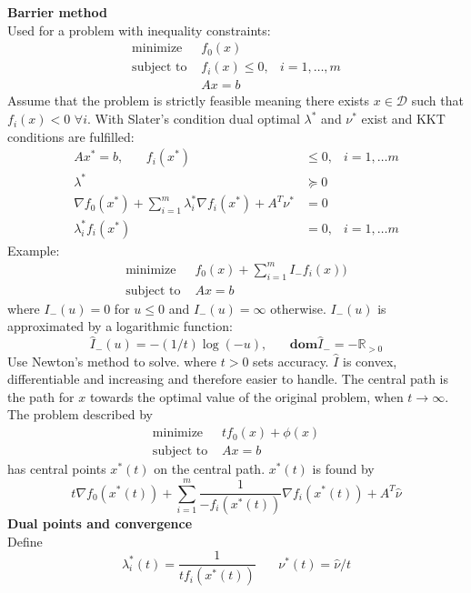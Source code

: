 \documentclass[12pt,a4paper]{report}
\begin{document}
\clearpage
{}\\\\
\textbf{Barrier method}\\
Used for a problem with inequality constraints:
\begin{align*}
\text{minimize }&f_0(x)\\
\text{subject to }&f_i(x)\leq0,&i=1,\ldots,m\\
&Ax=b
\end{align*}
Assume that the problem is strictly feasible meaning there exists $x\in\mathcal{D}$ such that $f_i(x)<0$ $\forall i$. With Slater's condition dual optimal $\lambda^*$ and $\nu^*$ exist and KKT conditions are fulfilled:
\begin{align*}
Ax^*=b,\phantom{mm}f_i(x^*)&\leq0,&i=1,\ldots m\\
\lambda^*&\succeq0\\
\nabla f_0(x^*)+\sum_{i=1}^m\lambda_i^*\nabla f_i(x^*)+A^T\nu^*&=0\\
\lambda_i^*f_i(x^*)&=0,&i=1,\ldots m
\end{align*}
Example:
\begin{align*}
\text{minimize }&f_0(x)+\sum_{i=1}^mI_-f_i(x))\\
\text{subject to }&Ax=b
\end{align*}
where $I_-(u)=0$ for $u\leq0$ and $I_-(u)=\infty$ otherwise. $I_-(u)$ is approximated by a logarithmic function:
\begin{equation}
\hat{I}_-(u)=-(1/t)\log(-u),\phantom{mm}\mathbf{dom}\hat{I}_-=-\mathbb{R}_{>0}
\end{equation}
Use Newton's method to solve.
where $t>0$ sets accuracy. $\hat{I}$ is convex, differentiable and increasing and therefore easier to handle. The central path is the path for $x$ towards the optimal value of the original problem, when $t\to\infty$. The problem described by
\begin{align*}
\text{minimize }&tf_0(x)+\phi(x)\\
\text{subject to }&Ax=b
\end{align*}
has central points $x^*(t)$ on the central path. $x^*(t)$ is found by
\begin{equation}
t\nabla f_0(x^*(t))+\sum_{i=1}^m\frac{1}{-f_i(x^*(t))}\nabla f_i(x^*(t))+A^T\hat{\nu}
\end{equation}
\textbf{Dual points and convergence}\\
Define
\begin{equation}
\lambda_i^*(t)=\frac{1}{tf_i(x^*(t))}\phantom{mm}\nu^*(t)=\hat{\nu}/t
\end{equation}
\end{document}
